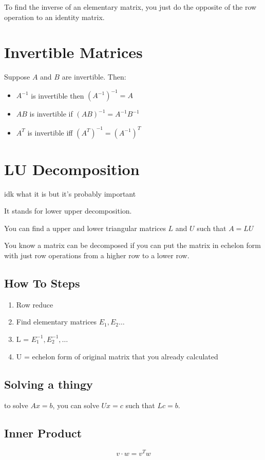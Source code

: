 \documentclass[fleqn]{report}
\begin{document}
To find the inverse of an elementary matrix, you just do the 
opposite of the row operation to an identity matrix.

\section{Invertible Matrices}
Suppose $A$ and $B$ are invertible. Then:
\begin{itemize}
    \item
    $A^{-1}$ is invertible then $(A^{-1})^{-1} = A$
    \item
    $AB$ is invertible if $(AB)^{-1} = A^{-1} B^{-1}$
    \item
    $A^T$ is invertible iff $(A^T)^{-1} = (A^{-1})^{T}$
\end{itemize}


\section{LU Decomposition}
idk what it is but it's probably important

It stands for lower upper decomposition.

You can find a upper and lower triangular matrices $L$ and $U$
such that $A = LU$

You know a matrix can be decomposed if you can put the matrix
in echelon form with just row operations from a higher row to 
a lower row. 

\subsection{How To Steps}
\begin{enumerate}
    \item 
    Row reduce
    \item
    Find elementary matrices $E_1, E_2 \ldots$
    \item 
    L = $E^{-1}_1, E^{-1}_2, \ldots$
    \item 
    U = echelon form of original matrix that you already calculated
\end{enumerate}

\subsection{Solving a thingy}
to solve $Ax = b$, you can solve $Ux = c$ such that $Lc = b$.


\subsection{Inner Product}
\[
v \cdot w = v^{T} w
\]
\end{document}
